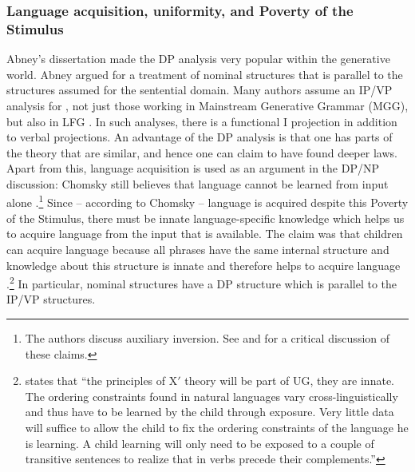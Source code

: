 \documentclass[output=paper
  ,nobabel
  ,draftmode
  ,uniformtopskip %
  ,colorlinks, citecolor=brown
]{langscibook}
\begin{document}
\subsubsection{Language acquisition, uniformity, and Poverty of the Stimulus}

Abney's dissertation \citep{Abney87a} made the DP analysis very popular within the generative world. Abney argued for
a treatment of  nominal structures that is parallel to the structures assumed for the
sentential domain. Many authors assume an IP/VP analysis for , not just those working in
Mainstream Generative Grammar (MGG), but also in LFG \citep*[]{BATW2015a}. In such analyses, there is a functional I
projection in addition to verbal projections. An advantage of the DP analysis is that one has parts
of the theory that are similar, and hence one can claim to have found deeper laws. Apart from this,
language acquisition is used as an argument in the DP/NP discussion: Chomsky still believes that
language cannot be learned from input alone \citep*{BPYC2011a}.\footnote{%
The authors discuss auxiliary inversion. See  and  for a
critical discussion of these claims.%
} 
Since -- according to Chomsky -- language is acquired despite this Poverty of the Stimulus, there must be innate
language-specific knowledge which helps us to acquire language from the input that is available.
The claim was that children can acquire language because all phrases have the same internal
structure and knowledge about this structure is innate and therefore helps to acquire language
\citep[]{Haegeman94a-u}.\footnote{%
  \citet[]{Haegeman94a-u} states that ``the principles of X$'$ theory will be part of UG,
  they are innate. The ordering constraints found in natural languages vary cross-linguistically and
  thus have to be learned by the child through exposure. Very little data will suffice to allow the
  child to fix the ordering constraints of the language he is learning. A child learning 
  will only need to be exposed to a couple of transitive sentences to realize that in  verbs
  precede their complements.''
} In particular, nominal structures have a DP structure which is parallel to the IP/VP structures.
\end{document}
